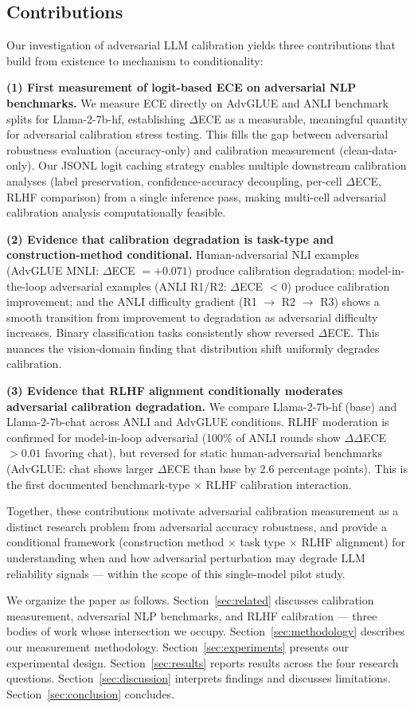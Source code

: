 \subsection{Contributions}

Our investigation of adversarial LLM calibration yields three contributions that build from existence to mechanism to conditionality:

\textbf{(1) First measurement of logit-based ECE on adversarial NLP benchmarks.} We measure ECE directly on AdvGLUE and ANLI benchmark splits for Llama-2-7b-hf, establishing $\Delta$ECE as a measurable, meaningful quantity for adversarial calibration stress testing. This fills the gap between adversarial robustness evaluation (accuracy-only) and calibration measurement (clean-data-only). Our JSONL logit caching strategy enables multiple downstream calibration analyses (label preservation, confidence-accuracy decoupling, per-cell $\Delta$ECE, RLHF comparison) from a single inference pass, making multi-cell adversarial calibration analysis computationally feasible.

\textbf{(2) Evidence that calibration degradation is task-type and construction-method conditional.} Human-adversarial NLI examples (AdvGLUE MNLI: $\Delta$ECE $= +0.071$) produce calibration degradation; model-in-the-loop adversarial examples (ANLI R1/R2: $\Delta$ECE $< 0$) produce calibration improvement; and the ANLI difficulty gradient (R1 $\rightarrow$ R2 $\rightarrow$ R3) shows a smooth transition from improvement to degradation as adversarial difficulty increases. Binary classification tasks consistently show reversed $\Delta$ECE. This nuances the vision-domain finding that distribution shift uniformly degrades calibration.

\textbf{(3) Evidence that RLHF alignment conditionally moderates adversarial calibration degradation.} We compare Llama-2-7b-hf (base) and Llama-2-7b-chat across ANLI and AdvGLUE conditions. RLHF moderation is confirmed for model-in-loop adversarial (100\% of ANLI rounds show $\Delta\Delta$ECE $> 0.01$ favoring chat), but reversed for static human-adversarial benchmarks (AdvGLUE: chat shows larger $\Delta$ECE than base by 2.6 percentage points). This is the first documented benchmark-type $\times$ RLHF calibration interaction.

Together, these contributions motivate adversarial calibration measurement as a distinct research problem from adversarial accuracy robustness, and provide a conditional framework (construction method $\times$ task type $\times$ RLHF alignment) for understanding when and how adversarial perturbation may degrade LLM reliability signals --- within the scope of this single-model pilot study.

We organize the paper as follows. Section~\ref{sec:related} discusses calibration measurement, adversarial NLP benchmarks, and RLHF calibration --- three bodies of work whose intersection we occupy. Section~\ref{sec:methodology} describes our measurement methodology. Section~\ref{sec:experiments} presents our experimental design. Section~\ref{sec:results} reports results across the four research questions. Section~\ref{sec:discussion} interprets findings and discusses limitations. Section~\ref{sec:conclusion} concludes.
